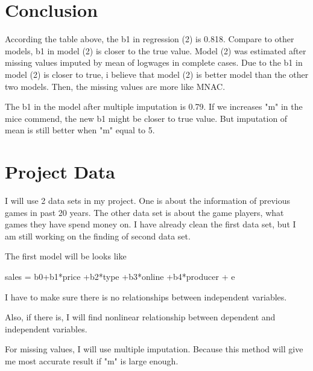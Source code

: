\documentclass{article}
\begin{document}
\section{Conclusion}
According the table above, the b1 in regression (2) is 0.818. Compare to other models, b1 in model (2) is closer to the true value. Model (2) was estimated after missing values imputed by mean of logwages in complete cases.
Due to the b1 in model (2) is closer to true, i believe that model (2) is better model than the other two models. Then, the missing values are more like MNAC.

The b1 in the model after multiple imputation is 0.79. If we increases "m" in the mice commend, the new b1 might be closer to true value. But imputation of mean is still better when "m" equal to 5.

\section{Project Data}

I will use 2 data sets in my project. One is about the information of previous games in past 20 years. The other data set is about the game players, what games they have spend money on. I have already clean the first data set, but I am still working on the finding of second data set. 

The first model will be looks like 

sales = b0+b1*price +b2*type +b3*online +b4*producer + e

I have to make sure there is no relationships between independent variables.

Also, if there is, I will find nonlinear relationship between dependent and independent variables.

For missing values, I will use multiple imputation. Because this method will give me most accurate result if "m" is large enough.
\end{document}
